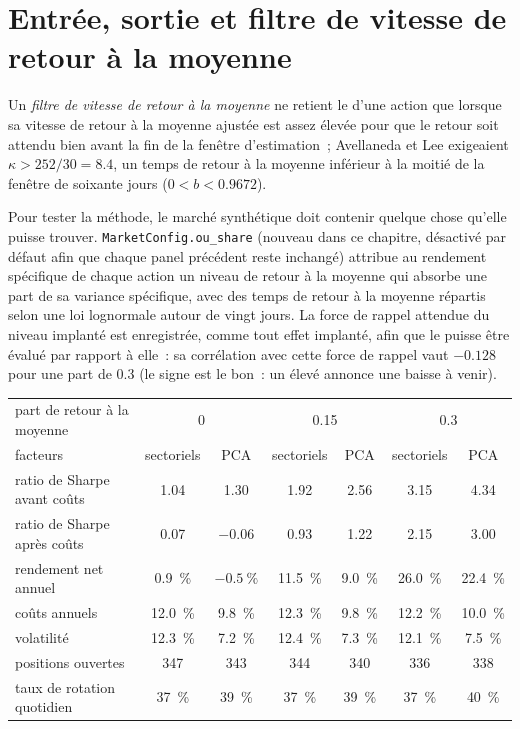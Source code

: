\section{Entrée, sortie et filtre de vitesse de retour à la moyenne}

\begin{definition}\label{def:s1:residual-and-principal-component-stat-arb:speed}
Un \emph{filtre de vitesse de retour à la moyenne} ne retient le  d'une action que lorsque sa vitesse de retour à la moyenne ajustée est assez élevée
pour que le retour soit attendu bien avant la fin de la fenêtre d'estimation~; Avellaneda et Lee exigeaient $\kappa > 252/30 = 8.4$, un temps de retour à la moyenne inférieur à la moitié de la
fenêtre de soixante jours ($0 < b < 0.9672$).
\end{definition}

Pour tester la méthode, le marché synthétique doit contenir quelque chose qu'elle puisse trouver. \texttt{MarketConfig.ou\_share} (nouveau dans ce chapitre, désactivé par défaut afin que chaque
panel précédent reste inchangé) attribue au rendement spécifique de chaque action un niveau de retour à la moyenne qui absorbe une part de sa variance spécifique, avec des temps de retour à la moyenne
répartis selon une loi lognormale autour de vingt jours. La force de rappel attendue du niveau implanté est enregistrée, comme tout effet implanté, afin que le  puisse être évalué par rapport à elle~: sa
corrélation avec cette force de rappel vaut $-0.128$ pour une part de 0.3 (le signe est le bon~: un  élevé annonce une baisse à venir).

\begin{center}
\small
\begin{tabular}{@{}lcccccc@{}}
\toprule
part de retour à la moyenne & \multicolumn{2}{c}{0} & \multicolumn{2}{c}{0.15} & \multicolumn{2}{c}{0.3}\\
facteurs & sectoriels & PCA & sectoriels & PCA & sectoriels & PCA\\
\midrule
ratio de Sharpe avant coûts & 1.04 & 1.30 & 1.92 & 2.56 & 3.15 & 4.34\\
ratio de Sharpe après coûts & 0.07 & $-0.06$ & 0.93 & 1.22 & 2.15 & 3.00\\
rendement net annuel & 0.9~\% & $-0.5~\%$ & 11.5~\% & 9.0~\% & 26.0~\% & 22.4~\%\\
coûts annuels & 12.0~\% & 9.8~\% & 12.3~\% & 9.8~\% & 12.2~\% & 10.0~\%\\
volatilité & 12.3~\% & 7.2~\% & 12.4~\% & 7.3~\% & 12.1~\% & 7.5~\%\\
positions ouvertes & 347 & 343 & 344 & 340 & 336 & 338\\
taux de rotation quotidien & 37~\% & 39~\% & 37~\% & 39~\% & 37~\% & 40~\%\\
\bottomrule
\end{tabular}
\end{center}

